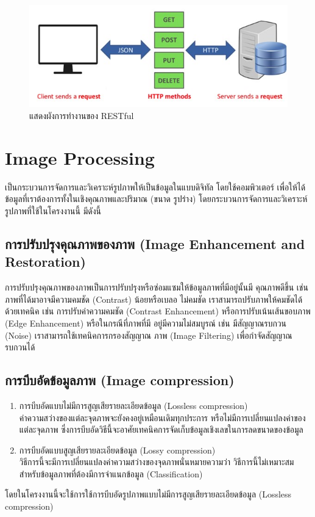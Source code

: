 \begin{figure}[!ht]
  \begin{center}
    \includegraphics[scale=.6]{pic/restapi.jpg}
    \caption[Poem]{แสดงผังการทำงานของ RESTful}
    \label{fig:restapi}
  \end{center}
\end{figure}

\section{Image Processing }
เป็นกระบวนการจัดการและวิเคราะห์รูปภาพให้เป็นข้อมูลในแบบดิจิทัล โดยใช้คอมพิวเตอร์ 
เพื่อให้ได้ข้อมูลที่เราต้องการทั้งในเชิงคุณภาพและปริมาณ (ขนาด รูปร่าง) \cite{Image} โดยกระบวนการจัดการและวิเคราะห์รูปภาพที่ใช้ในโครงงานนี้ มีดังนี้

\subsection{การปรับปรุงคุณภาพของภาพ   (Image Enhancement and Restoration) }
การปรับปรุงคุณภาพของภาพเป็นการปรับปรุงหรือซ่อมแซมให้ข้อมูลภาพที่มีอยู่นั้นมี คุณภาพดีขึ้น เช่น ภาพที่ได้มาอาจมีความคมชัด (Contrast) น้อยหรือเบลอ ไม่คมชัด 
เราสามารถปรับภาพให้คมชัดได้ด้วยเทคนิค เช่น การปรับค่าความคมชัด (Contrast Enhancement) หรือการปรับเน้นเส้นขอบภาพ (Edge Enhancement) 
หรือในกรณีที่ภาพที่มี อยู่มีความไม่สมบูรณ์ เช่น มีสัญญาณรบกวน (Noise) เราสามารถใช้เทคนิคการกรองสัญญาณ ภาพ (Image Filtering) เพื่อกำจัดสัญญาณรบกวนได้

\subsection{การบีบอัดข้อมูลภาพ (Image compression)}
\begin{enumerate}
  \item การบีบอัดแบบไม่มีการสูญเสียรายละเอียดข้อมูล (Lossless compression) \\
  ค่าความสว่างของแต่ละจุดภาพจะยังคงอยู่เหมือนเดิมทุกประการ หรือไม่มีการเปลี่ยนแปลงค่าของแต่ละจุดภาพ 
  ซึ่งการบีบอัดวิธีนี้จะอาศัยเทคนิคการจัดเก็บข้อมูลเชิงเลขในการลดขนาดของข้อมูล
  \item การบีบอัดแบบสูญเสียรายละเอียดข้อมูล (Lossy compression) \\
  วิธีการนี้จะมีการเปลี่ยนแปลงค่าความสว่างของจุดภาพนั่นหมายความว่า วิธีการนี้ไม่เหมาะสมสำหรับข้อมูลภาพที่ต้องมีการจำแนกข้อมูล (Classification)
\end{enumerate}
โดยในโครงงานนี้จะใช้การใช้การบีบอัดรูปภาพแบบไม่มีการสูญเสียรายละเอียดข้อมูล (Lossless compression)
\\
\\
\\
\\
\\

